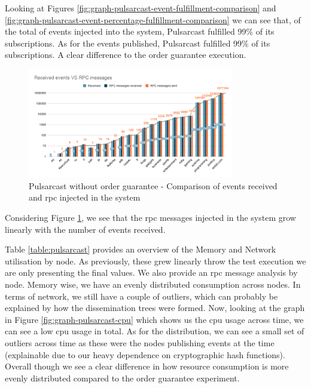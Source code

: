 Looking at Figures \ref{fig:graph-pulsarcast-event-fulfillment-comparison} and
\ref{fig:graph-pulsarcast-event-percentage-fulfillment-comparison} we can see
that, of the total of events injected into the system, Pulsarcast fulfilled
99\% of its subscriptions. As for the events published, Pulsarcast fulfilled
99\% of its subscriptions. A clear difference to the order guarantee execution.

\begin{figure}[!htb]
  \centering
  \includegraphics[width=0.8\textwidth]{img/graph-pulsarcast-rpc.png}
  \caption{Pulsarcast without order guarantee - Comparison of events received and \acrshort{rpc} injected in the system}
  \label{fig:graph-pulsarcast-rpc}
\end{figure}

Considering Figure \ref{fig:graph-pulsarcast-rpc}, we see that the \acrshort{rpc} messages
injected in the system grow linearly with the number of events received.

Table \ref{table:pulsarcast} provides an overview of the Memory and Network
utilisation by node. As previously, these grew linearly throw the test
execution we are only presenting the final values. We also provide an
\acrshort{rpc} message analysis by node. Memory wise, we have an evenly
distributed consumption across nodes. In terms of network, we still have a
couple of outliers, which can probably be explained by how the dissemination
trees were formed.  Now, looking at the graph in Figure
\ref{fig:graph-pulsarcast-cpu} which shows us the \acrshort{cpu} usage across
time, we can see a low \acrshort{cpu} usage in total. As for the distribution,
we can see a small set of outliers across time as these were the nodes
publishing events at the time (explainable due to our heavy dependence on
cryptographic hash functions).  Overall though we see a clear difference in how
resource consumption is more evenly distributed compared to the order guarantee
experiment.

